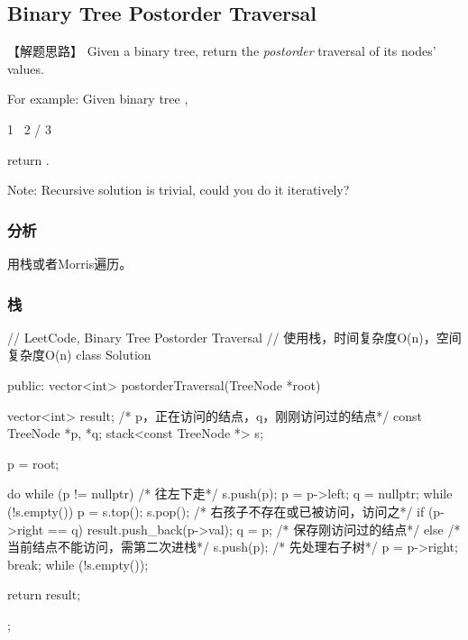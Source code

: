 \subsection{Binary Tree Postorder Traversal}
\label{sec:binary-tree-postorder-traversal}


【解题思路】
Given a binary tree, return the \emph{postorder} traversal of its nodes' values.

For example:
Given binary tree ,
\begin{Code}
	1
	\
	2
	/
	3
\end{Code}
return \code{[3,2,1]}.

Note: Recursive solution is trivial, could you do it iteratively?


\subsubsection{分析}
用栈或者Morris遍历。


\subsubsection{栈}
\begin{Code}
	// LeetCode, Binary Tree Postorder Traversal
	// 使用栈，时间复杂度O(n)，空间复杂度O(n)
	class Solution {
		public:
		vector<int> postorderTraversal(TreeNode *root) {
			vector<int> result;
			/* p，正在访问的结点，q，刚刚访问过的结点*/
			const TreeNode *p, *q;
			stack<const TreeNode *> s;
			
			p = root;
			
			do {
				while (p != nullptr) { /* 往左下走*/
					s.push(p);
					p = p->left;
				}
				q = nullptr;
				while (!s.empty()) {
					p = s.top();
					s.pop();
					/* 右孩子不存在或已被访问，访问之*/
					if (p->right == q) {
						result.push_back(p->val);
						q = p; /* 保存刚访问过的结点*/
					} else {
					/* 当前结点不能访问，需第二次进栈*/
					s.push(p);
					/* 先处理右子树*/
					p = p->right;
					break;
				}
			}
		} while (!s.empty());
		
		return result;
	}
};
\end{Code}


